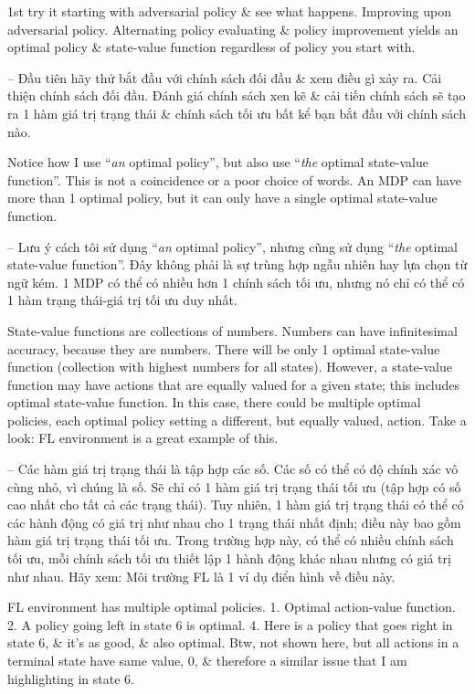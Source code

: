 \documentclass{article}
\begin{document}
\begin{itemize}
\begin{itemize}
\begin{itemize}
            1st try it starting with adversarial policy \& see what happens. {\sf Improving upon adversarial policy.} Alternating policy evaluating \& policy improvement yields an optimal policy \& state-value function regardless of policy you start with.

            -- Đầu tiên hãy thử bắt đầu với chính sách đối đầu \& xem điều gì xảy ra. {\sf Cải thiện chính sách đối đầu.} Đánh giá chính sách xen kẽ \& cải tiến chính sách sẽ tạo ra 1 hàm giá trị trạng thái \& chính sách tối ưu bất kể bạn bắt đầu với chính sách nào.

            Notice how I use ``{\it an} optimal policy'', but also use ``{\it the} optimal state-value function''. This is not a coincidence or a poor choice of words. An MDP can have more than 1 optimal policy, but it can only have a single optimal state-value function.

            -- Lưu ý cách tôi sử dụng ``{\it an} optimal policy'', nhưng cũng sử dụng ``{\it the} optimal state-value function''. Đây không phải là sự trùng hợp ngẫu nhiên hay lựa chọn từ ngữ kém. 1 MDP có thể có nhiều hơn 1 chính sách tối ưu, nhưng nó chỉ có thể có 1 hàm trạng thái-giá trị tối ưu duy nhất.

            State-value functions are collections of numbers. Numbers can have infinitesimal accuracy, because they are numbers. There will be only 1 optimal state-value function (collection with highest numbers for all states). However, a state-value function may have actions that are equally valued for a given state; this includes optimal state-value function. In this case, there could be multiple optimal policies, each optimal policy setting a different, but equally valued, action. Take a look: FL environment is a great example of this.

            -- Các hàm giá trị trạng thái là tập hợp các số. Các số có thể có độ chính xác vô cùng nhỏ, vì chúng là số. Sẽ chỉ có 1 hàm giá trị trạng thái tối ưu (tập hợp có số cao nhất cho tất cả các trạng thái). Tuy nhiên, 1 hàm giá trị trạng thái có thể có các hành động có giá trị như nhau cho 1 trạng thái nhất định; điều này bao gồm hàm giá trị trạng thái tối ưu. Trong trường hợp này, có thể có nhiều chính sách tối ưu, mỗi chính sách tối ưu thiết lập 1 hành động khác nhau nhưng có giá trị như nhau. Hãy xem: Môi trường FL là 1 ví dụ điển hình về điều này.

            {\sf FL environment has multiple optimal policies.} 1. Optimal action-value function. 2. A policy going left in state 6 is optimal. 4. Here is a policy that goes right in state 6, \& it's as good, \& also optimal. Btw, not shown here, but all actions in a terminal state have same value, 0, \& therefore a similar issue that I am highlighting in state 6.


\end{itemize}
\end{itemize}
\end{itemize}
\end{document}
